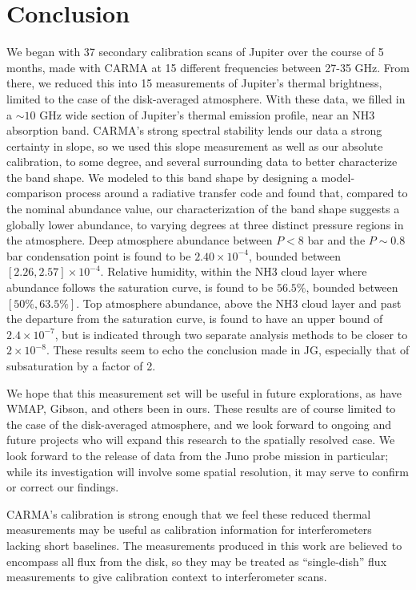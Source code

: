 \documentclass{article}
\newcommand{\e}[1]{\times 10^{#1}}
\begin{document}
\section{Conclusion}
We began with 37 secondary calibration scans of Jupiter over the course of 5 months, made with CARMA at 15 different frequencies between 27-35 GHz.
From there, we reduced this into 15 measurements of Jupiter's thermal brightness, limited to the case of the disk-averaged atmosphere.
With these data, we filled in a $\sim 10$ GHz wide section of Jupiter's thermal emission profile, near an NH3 absorption band.
CARMA's strong spectral stability lends our data a strong certainty in slope, so we used this slope measurement as well as our absolute calibration, to some degree, and several surrounding data to better characterize the band shape.
We modeled to this band shape by designing a model-comparison process around a radiative transfer code and found that, compared to the nominal abundance value, our characterization of the band shape suggests a globally lower abundance, to varying degrees at three distinct pressure regions in the atmosphere.
Deep atmosphere abundance between $P < 8$ bar and the $P \sim 0.8$ bar condensation point is found to be $2.40\e{-4}$, bounded between $[2.26, 2.57] \e{-4}$.
Relative humidity, within the NH3 cloud layer where abundance follows the saturation curve, is found to be $56.5\%$, bounded between $[50\%, 63.5\%]$.
Top atmosphere abundance, above the NH3 cloud layer and past the departure from the saturation curve, is found to have an upper bound of $2.4\e{-7}$, but is indicated through two separate analysis methods to be closer to $2\e{-8}$.
These results seem to echo the conclusion made in JG, especially that of subsaturation by a factor of 2.

We hope that this measurement set will be useful in future explorations, as have WMAP, Gibson, and others been in ours.
These results are of course limited to the case of the disk-averaged atmosphere, and we look forward to ongoing and future projects who will expand this research to the spatially resolved case.
We look forward to the release of data from the Juno probe mission in particular; while its investigation will involve some spatial resolution, it may serve to confirm or correct our findings.

CARMA's calibration is strong enough that we feel these reduced thermal measurements may be useful as calibration information for interferometers lacking short baselines.
The measurements produced in this work are believed to encompass all flux from the disk, so they may be treated as ``single-dish'' flux measurements to give calibration context to interferometer scans.
\end{document}
